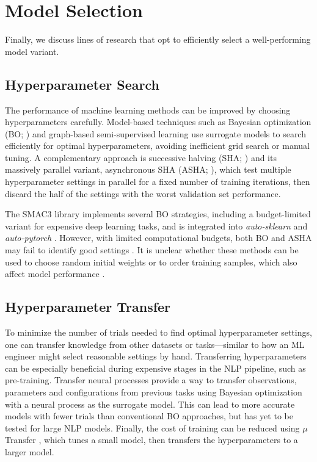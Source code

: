 \section{Model Selection} \label{sec:model_selection}
Finally, we discuss lines of research that opt to efficiently select a well-performing model variant.

\subsection{Hyperparameter Search} The performance of machine learning methods can be improved by choosing hyperparameters carefully. Model-based techniques such as Bayesian optimization (BO; \citealp{snoek2012practical,feurer2015efficient}) and graph-based semi-supervised learning \citep{zhang-duh-2020-reproducible} use surrogate models to search efficiently for optimal hyperparameters, avoiding inefficient grid search or manual tuning. A complementary approach is successive halving  (SHA;  \citealp{jamieson2016non}) and its massively parallel variant, asynchronous SHA (ASHA; \citealp{li2020system}), which test multiple hyperparameter settings in parallel for a fixed number of training iterations, then discard the half of the settings with the worst validation set performance. 

The SMAC3 library \cite{lindauer2022smac3} implements several BO strategies, including a budget-limited variant for expensive deep learning tasks, and is integrated into \emph{auto-sklearn} \citep{feurer2020auto} and \emph{auto-pytorch} \citep{zimmer2021auto}. However, with limited computational budgets, both BO and ASHA may fail to identify good settings \cite{liu-wang-2021-empirical}. It is unclear whether these methods can be used to choose random initial weights or to order training samples, which also affect model performance \cite{Dodge:2020}.

\subsection{Hyperparameter Transfer} To minimize the number of trials needed to find optimal hyperparameter settings, one can transfer knowledge from other datasets or tasks---similar to how an ML engineer might select reasonable settings by hand. Transferring hyperparameters can be especially beneficial during expensive stages in the NLP pipeline, such as pre-training. Transfer neural processes \cite{wei2021meta} provide a way to transfer observations, parameters and configurations from previous tasks using Bayesian optimization with a neural process as the surrogate model. This can lead to more accurate models with fewer trials than conventional BO approaches, but has yet to be tested for large NLP models. Finally, the cost of training can be reduced using $\mu$Transfer \cite{yang2021tuning}, which tunes a small model, then transfers the hyperparameters to a larger model.

